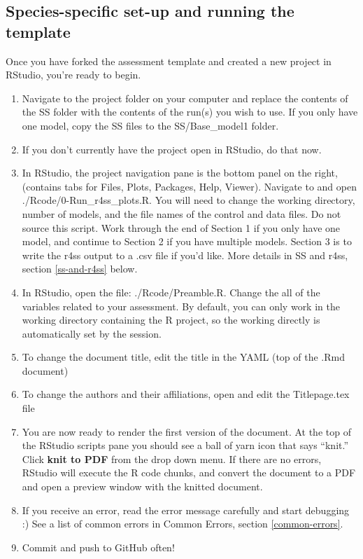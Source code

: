 \documentclass[12pt,]{article}
\begin{document}
\subsection{Species-specific set-up and running the
template}\label{species-specific-set-up-and-running-the-template}

Once you have forked the assessment template and created a new project
in RStudio, you're ready to begin.

\begin{enumerate}
\def\labelenumi{\arabic{enumi}.}
\item
  Navigate to the project folder on your computer and replace the
  contents of the SS folder with the contents of the run(s) you wish to
  use. If you only have one model, copy the SS files to the
  SS/Base\_model1 folder.
\item
  If you don't currently have the project open in RStudio, do that now.
\item
  In RStudio, the project navigation pane is the bottom panel on the
  right, (contains tabs for Files, Plots, Packages, Help, Viewer).
  Navigate to and open ./Rcode/0-Run\_r4ss\_plots.R. You will need to
  change the working directory, number of models, and the file names of
  the control and data files. Do not source this script. Work through
  the end of Section 1 if you only have one model, and continue to
  Section 2 if you have multiple models. Section 3 is to write the r4ss
  output to a .csv file if you'd like. More details in SS and r4ss,
  section \ref{ss-and-r4ss} below.
\item
  In RStudio, open the file: ./Rcode/Preamble.R. Change the all of the
  variables related to your assessment. By default, you can only work in
  the working directory containing the R project, so the working
  directly is automatically set by the session.
\item
  To change the document title, edit the title in the YAML (top of the
  .Rmd document)
\item
  To change the authors and their affiliations, open and edit the
  Titlepage.tex file
\item
  You are now ready to render the first version of the document. At the
  top of the RStudio scripts pane you should see a ball of yarn icon
  that says ``knit.'' Click \textbf{knit to PDF} from the drop down
  menu. If there are no errors, RStudio will execute the R code chunks,
  and convert the document to a PDF and open a preview window with the
  knitted document.
\item
  If you receive an error, read the error message carefully and start
  debugging :) See a list of common errors in Common Errors, section
  \ref{common-errors}.
\item
  Commit and push to GitHub often!
\end{enumerate}
\end{document}
